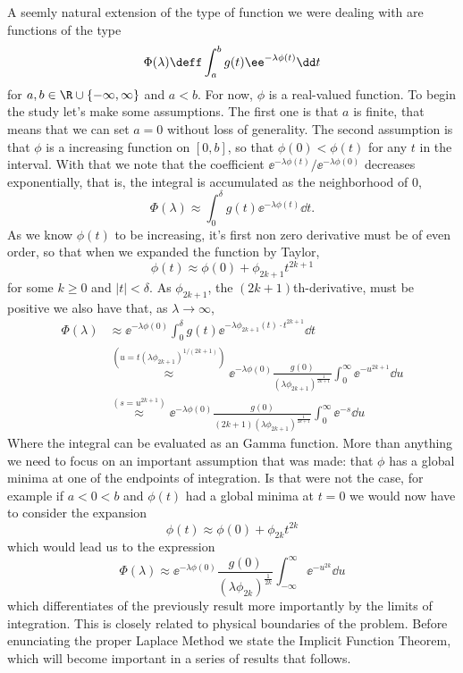 A seemly natural extension of the type of function we were dealing with are functions of the type
\begin{equation}
	\Phi(\lambda) \deff \int_{a}^{b} g(t) \ee^{-\lambda \phi(t)} \dd t
	\label{equation: Laplace}
\end{equation}
for $a,b \in \R \cup \{-\infty, \infty\}$ and $a<b$. For now, $\phi$ is a real-valued function. To begin the study let's make some assumptions. The first one is that $a$ is finite, that means that we can set $a=0$ without loss of generality. The second assumption is that $\phi$ is a increasing function on $[0,b]$, so that $\phi(0) < \phi(t)$ for any $t$ in the interval. With that we note that the coefficient $\ee^{-\lambda \phi(t)} / \ee^{-\lambda \phi(0)}$ decreases exponentially, that is, the integral is accumulated as the neighborhood of $0$,
\begin{equation}
	\Phi(\lambda) \approx \int_{0}^{\delta} g(t) \ee^{-\lambda \phi(t)} \dd t.
\end{equation}
As we know $\phi(t)$ to be increasing, it's first non zero derivative must be of even order, so that when we expanded the function by Taylor, 
\begin{equation}
\phi(t) \approx \phi(0) + \phi_{2k+1} t^{2k+1}	
\end{equation}
for some $k\geq 0$ and $|t| < \delta$. As $\phi_{2k+1}$, the $(2k+1)$th-derivative, must be positive we also have that, as $\lambda \rightarrow \infty$,
	\begin{align}
		\Phi(\lambda) & \approx \ee^{-\lambda \phi(0)} \int_{0}^{\delta} g(t) \ee^{-\lambda \phi_{2k+1}(t) \cdot t^{2k+1}} \dd t\\
		& \stackrel{(u=t(\lambda \phi_{2k+1})^{1/(2k+1)})}{\approx} \ee^{-\lambda \phi(0)} \frac{g(0)}{(\lambda \phi_{2k+1})^{\frac{1}{2k+1}}} \int_{0}^{\infty} \ee^{-u^{2k+1}} \dd u \\
		& \stackrel{(s=u^{2k+1})}{\approx} \ee^{-\lambda \phi(0)} \frac{g(0)}{ (2k+1)(\lambda \phi_{2k+1})^{\frac{1}{2k+1}}} \int_{0}^{\infty} \ee^{-s} \dd u
	\end{align}
Where the integral can be evaluated as an Gamma function. More than anything we need to focus on an important assumption that was made: that $\phi$ has a global minima at one of the endpoints of integration. Is that were not the case, for example if $a < 0 < b$ and $\phi(t)$ had a global minima at $t=0$ we would now have to consider the expansion
\begin{equation}
\phi(t) \approx \phi(0) + \phi_{2k} t^{2k}	
\end{equation}
which would lead us to the expression
\begin{equation}
\Phi(\lambda) \approx \ee^{-\lambda \phi(0)} \frac{g(0)}{(\lambda \phi_{2k})^{\frac{1}{2k}}} \int_{-\infty}^{\infty} \ee^{-u^{2k}} \dd u	
\end{equation}
which differentiates of the previously result more importantly by the limits of integration. This is closely related to physical boundaries of the problem. Before enunciating the proper Laplace Method we state the Implicit Function Theorem, which will become important in a series of results that follows.

